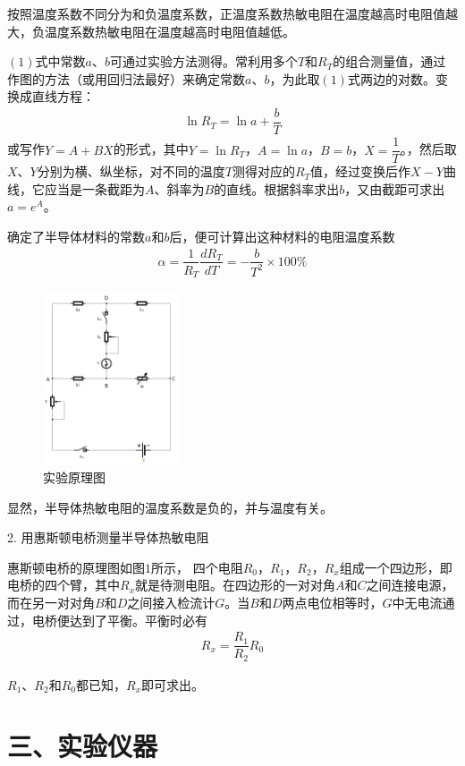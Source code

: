 \documentclass[11pt]{article}
\begin{document}
按照温度系数不同分为和负温度系数，正温度系数热敏电阻在温度越高时电阻值越大，负温度系数热敏电阻在温度越高时电阻值越低。

$(1)$式中常数$a$、$b$可通过实验方法测得。常利用多个$T$和$R_T$的组合测量值，通过作图的方法（或用回归法最好）来确定常数$a$、$b$，为此取$(1)$式两边的对数。变换成直线方程：
\begin{align}
    \ln R_T=\ln a+\dfrac{b}{T}
\end{align}
或写作$Y=A+BX$的形式，其中$Y=\ln R_T$，$A=\ln a$，$B=b$，$X=\dfrac{1}{T}$。，然后取$X$、$Y$分别为横、纵坐标，对不同的温度$T$测得对应的$R_T$值，经过变换后作$X-Y$曲线，它应当是一条截距为$A$、斜率为$B$的直线。根据斜率求出$b$，又由截距可求出$a=e^A$。

确定了半导体材料的常数$a$和$b$后，便可计算出这种材料的电阻温度系数
\begin{align}
    \alpha=\dfrac{1}{R_T}\dfrac{dR_T}{dT}=-\dfrac{b}{T^2}\times100\%
\end{align}

\begin{figure}
    \centering
    \includegraphics[width=4cm]{Figs/实验原理图.png}
    \caption{\small 实验原理图}
\end{figure}

显然，半导体热敏电阻的温度系数是负的，并与温度有关。

2. 用惠斯顿电桥测量半导体热敏电阻

惠斯顿电桥的原理图如图$1$所示， 四个电阻$R_0$，$R_1$，$R_2$，$R_x$组成一个四边形，即电桥的四个臂，其中$R_x$就是待测电阻。在四边形的一对对角$A$和$C$之间连接电源，而在另一对对角$B$和$D$之间接入检流计$G$。当$B$和$D$两点电位相等时，$G$中无电流通过，电桥便达到了平衡。平衡时必有
\begin{align}
    R_x=\dfrac{R_1}{R_2}R_0
\end{align}

$R_1$、$R_2$和$R_0$都已知，$R_x$即可求出。

\section*{三、实验仪器}
\end{document}
